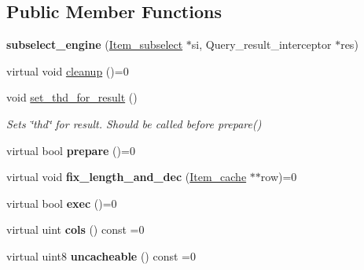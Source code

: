 \subsection*{Public Member Functions}
\begin{DoxyCompactItemize}
\item 
\mbox{\label{classsubselect__engine_a8aab885ca71e721b2183b3136c70c14c}} 
{\bfseries subselect\+\_\+engine} (\mbox{\hyperlink{classItem__subselect}{Item\+\_\+subselect}} $\ast$si, Query\+\_\+result\+\_\+interceptor $\ast$res)
\item 
virtual void \mbox{\hyperlink{classsubselect__engine_a0f0051f24ecc4b20f0e3f8d817293276}{cleanup}} ()=0
\item 
\mbox{\label{classsubselect__engine_ae50c50290a2156dd827b8420ec124612}} 
void \mbox{\hyperlink{classsubselect__engine_ae50c50290a2156dd827b8420ec124612}{set\+\_\+thd\+\_\+for\+\_\+result}} ()
\begin{DoxyCompactList}\small\item\em Sets \char`\"{}thd\char`\"{} for \textquotesingle{}result\textquotesingle{}. Should be called before prepare() \end{DoxyCompactList}\item 
\mbox{\label{classsubselect__engine_aa23e6f55b74bd01d54425eb0c64a2994}} 
virtual bool {\bfseries prepare} ()=0
\item 
\mbox{\label{classsubselect__engine_a388d2320757351458fbdc6ae44517612}} 
virtual void {\bfseries fix\+\_\+length\+\_\+and\+\_\+dec} (\mbox{\hyperlink{classItem__cache}{Item\+\_\+cache}} $\ast$$\ast$row)=0
\item 
\mbox{\label{classsubselect__engine_add4e0993d451cbb03720d9f3d24b0114}} 
virtual bool {\bfseries exec} ()=0
\item 
\mbox{\label{classsubselect__engine_a2a7da12fc1a6282a9ce13db4d4473851}} 
virtual uint {\bfseries cols} () const =0
\item 
\mbox{\label{classsubselect__engine_adcd4c89f57cae9849b65e1591660f5bc}} 
virtual uint8 {\bfseries uncacheable} () const =0
$$
\end{DoxyCompactItemize}
